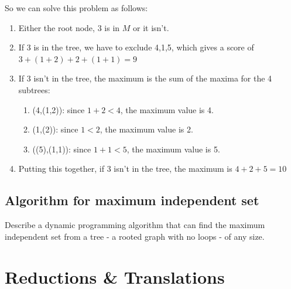 \documentclass[]{article}
\begin{document}
So we can solve this problem as follows:
\begin{enumerate}
	\item Either the root node, $3$ is in $M$ or it isn't.
	\item If $3$ is in the tree, we have to exclude {4,1,5}, which gives a score of $3+(1+2)+2+(1+1)=9$
	\item If $3$ isn't in the tree, the maximum is the sum of the maxima for the 4 subtrees:
	\begin{enumerate}
		\item (4,(1,2)): since $1+2<4$, the maximum value is 4.
		\item (1,(2)): since $1<2$, the maximum value is 2. 
		\item ((5),(1,1)): since $1+1<5$, the maximum value is 5.
	\end{enumerate}
	\item Putting this together, if $3$ isn't in the tree, the maximum is $4+2+5=10$
\end{enumerate}

\subsection{Algorithm for maximum independent set}
Describe a dynamic programming algorithm that can find the maximum independent set from a tree - a rooted graph with no loops - of any size.

\section{Reductions \& Translations }



%
%
\end{document}
